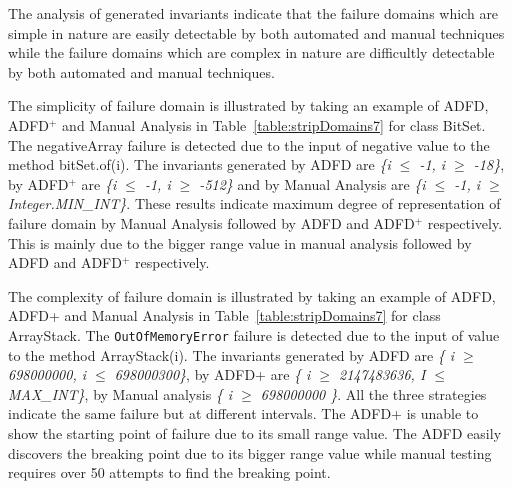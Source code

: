 The analysis of generated invariants indicate that the failure domains which are simple in nature are easily detectable by both automated and manual techniques while the failure domains which are complex in nature are difficultly detectable by both automated and manual techniques. %

The simplicity of failure domain is illustrated by taking an example of ADFD, ADFD$^+$ and Manual Analysis in Table~\ref{table:stripDomains7} for class BitSet. The negativeArray failure is detected due to the input of negative value to the method bitSet.of(i). The invariants generated by ADFD are \textit{\{i $\le$ -1, i $\ge$ -18\}}, by ADFD$^+$ are \textit{\{i $\le$ -1, i $\ge$ -512\}} and by Manual Analysis are \textit{\{i $\le$ -1, i $\ge$ Integer.MIN\_INT\}}. These results indicate maximum degree of representation of failure domain by Manual Analysis followed by ADFD and ADFD$^+$ respectively. This is mainly due to the bigger range value in manual analysis followed by ADFD and ADFD$^+$ respectively. 


The complexity of failure domain is illustrated by taking an example of ADFD, ADFD+ and Manual Analysis in Table~\ref{table:stripDomains7} for class ArrayStack. The \verb+OutOfMemoryError+ failure is detected due to the input of value to the method ArrayStack(i). The invariants generated by ADFD are \textit{\{ i $\ge$ 698000000, i $\le$ 698000300\}}, by ADFD+ are \textit{\{ i $\ge$ 2147483636, I $\le$ MAX\_INT\}}, by Manual analysis \textit{\{ i $\ge$ 698000000 \}}. All the three strategies indicate the same failure but at different intervals. The ADFD+ is unable to show the starting point of failure due to its small range value. The ADFD easily discovers the breaking point due to its bigger range value while manual testing requires over 50 attempts to find the breaking point.





